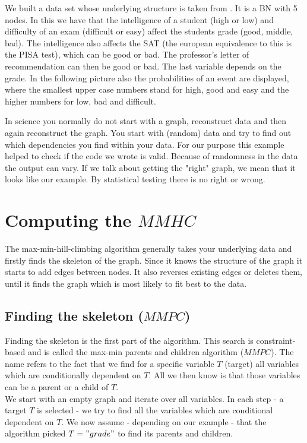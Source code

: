 		We built a data set whose underlying structure is taken from \cite{KoFr}. It is a BN with 5 nodes. In this we have that the intelligence of a student (high or low) and difficulty of an exam (difficult or easy) affect the students grade (good, middle, bad). The intelligence also affects the SAT (the european equivalence to this is the PISA test), which can be good or bad. The professor's letter of recommendation can then be good or bad. The last variable depends on the grade. In the following picture also the probabilities of an event are displayed, where the smallest upper case numbers stand for high, good and easy and the higher numbers for low, bad and difficult.

		 \label{img.exampleGraph}

		In science you normally do not start with a graph, reconstruct data and then again reconstruct the graph. You start with (random) data and try to find out which dependencies you find within your data. For our purpose this example helped to check if the code we wrote is valid. Because of randomness in the data the output can vary. If we talk about getting the "right" graph, we mean that it looks like our example. By statistical testing there is no right or wrong.

	\section{Computing the $MMHC$}

		The max-min-hill-climbing algorithm generally takes your underlying data and firstly finds the skeleton of the graph. Since it knows the structure of the graph it starts to add edges between nodes. It also reverses existing edges or deletes them, until it finds the graph which is most likely to fit best to the data.

		\subsection*{Finding the skeleton ($MMPC$)}

			Finding the skeleton is the first part of the algorithm. This search is constraint-based and is called the max-min parents and children algorithm ($MMPC$). The name refers to the fact that we find for a specific variable $T$ (target) all variables which are conditionally dependent on $T$. All we then know is that those variables can be a parent or a child of $T$.\\
			We start with an empty graph and iterate over all variables. In each step - a target $T$ is selected - we try to find all the variables which are conditional dependent on $T$. We now assume - depending on our example - that the algorithm picked $T = "grade"$ to find its parents and children.

